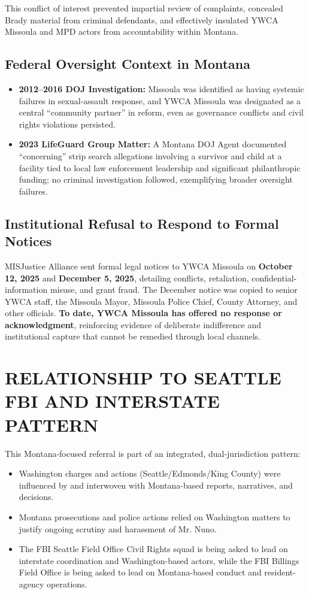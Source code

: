 \documentclass[12pt,oneside]{article}
\begin{document}
\begin{flushleft}
This conflict of interest prevented impartial review of complaints, concealed Brady material from criminal defendants, and effectively insulated YWCA Missoula and MPD actors from accountability within Montana.

\subsection*{Federal Oversight Context in Montana}

\begin{itemize}
\item \textbf{2012--2016 DOJ Investigation:} Missoula was identified as having systemic failures in sexual-assault response, and YWCA Missoula was designated as a central “community partner” in reform, even as governance conflicts and civil rights violations persisted.
\item \textbf{2023 LifeGuard Group Matter:} A Montana DOJ Agent documented “concerning” strip search allegations involving a survivor and child at a facility tied to local law enforcement leadership and significant philanthropic funding; no criminal investigation followed, exemplifying broader oversight failures.
\end{itemize}

\subsection*{Institutional Refusal to Respond to Formal Notices}

MISJustice Alliance sent formal legal notices to YWCA Missoula on \textbf{October 12, 2025} and \textbf{December 5, 2025}, detailing conflicts, retaliation, confidential-information misuse, and grant fraud. The December notice was copied to senior YWCA staff, the Missoula Mayor, Missoula Police Chief, County Attorney, and other officials. \textbf{To date, YWCA Missoula has offered no response or acknowledgment}, reinforcing evidence of deliberate indifference and institutional capture that cannot be remedied through local channels.

\section*{RELATIONSHIP TO SEATTLE FBI AND INTERSTATE PATTERN}

This Montana-focused referral is part of an integrated, dual-jurisdiction pattern:

\begin{itemize}
\item Washington charges and actions (Seattle/Edmonds/King County) were influenced by and interwoven with Montana-based reports, narratives, and decisions.
\item Montana prosecutions and police actions relied on Washington matters to justify ongoing scrutiny and harassment of Mr. Nuno.
\item The FBI Seattle Field Office Civil Rights squad is being asked to lead on interstate coordination and Washington-based actors, while the FBI Billings Field Office is being asked to lead on Montana-based conduct and resident-agency operations.
\end{itemize}


\end{flushleft}
\end{document}
